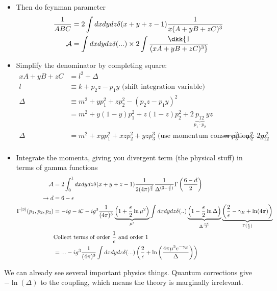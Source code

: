 \documentclass[9pt]{scrartcl}
\begin{document}
\begin{itemize}
	\item Then do feynman parameter
	\begin{align}
		{1 \over ABC} &= 2 \int dx dy dz \delta(x + y + z -1) {1 \over x (A + yB + zC)^3} \\
		\mathcal{A} & = \int dxdydz \delta(...) \times 2 \int \dkk {1 \over (x A + yB + zC)^3 }
	\end{align}
	\item Simplify the denominator by completing square:
	\begin{align}
		xA + yB + zC &= l^2 + \Delta \\
		l & \equiv k + p_2 z - p_1 y  \text{ (shift integration variable)}\\
		\Delta & \equiv m^2 + y p_1^2 + z p_2^2 - (p_2 z - p_1 y)^2 \\
		&= m^2 + y(1-y) p_1^2 + z(1-z) p_2^2 + 2 \underbrace{p_{12}}_{p_1 \cdot p_2} yz \\
		 \Delta & = m^2 + xy p_1^2 + xz p_2^2 + yz p_3^3 
		  \text{ (use momentum conservation): } 2 p_{12} & = p_3^2 - p_2^2 - p_1^2  \\
	\end{align}


	\item Integrate the momenta, giving you divergent term (the physical stuff) in terms of gamma functions
	\begin{align}
		\mathcal{A} &= 2 \int_0^1 dx dy dz \delta(x + y + z -1) {1 \over 2 (4 \pi)^{d \over 2}} {1 \over \Delta^{(3 - {d \over 2})}} \Gamma \left( {6 - d \over 2}\right) \\
		\rightarrow d &= 6 - \epsilon \\
		\Gamma^{(3)}(p_1, p_2, p_3) &= - ig - i \mathcal{C} - i g^3 {1 \over (4 \pi)^3} \underbrace{ \left(1 + {\epsilon \over 2} \ln \mu^2 \right)}_{\mu^{\epsilon}} \int dxdydz \delta(..) \underbrace{\left(1 - {\epsilon \over 2} \ln \Delta \right)}_{\Delta^{-\epsilon \over 2}}  \underbrace{\left({2 \over \epsilon} - \gamma_E + \ln (4 \pi) \right)}_{\Gamma({\epsilon \over 2})} \\
		& \text{Collect terms of order } {1 \over \epsilon} \text{ and order } 1 \\  
		& =  ... - i g^3 {1 \over (4 \pi)^3} \int dxdydz \delta(...)  \left({2 \over \epsilon} + \ln \left({4 \pi \mu^2 e^{- \gamma_E} \over \Delta} \right) \right)
	\end{align}
\end{itemize}
We can already see several important physics things.  Quantum corrections give $- \ln(\Delta)$ to the coupling, which means the theory is marginally irrelevant.
\end{document}
